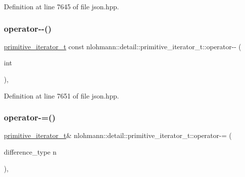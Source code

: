 Definition at line 7645 of file json.\+hpp.

\mbox{\label{classnlohmann_1_1detail_1_1primitive__iterator__t_aef3b5dfeb2cb04dc9d0a024fc1898b98}} 
\subsubsection{\texorpdfstring{operator-\/-\/()}{operator--()}\hspace{0.1cm}{\footnotesize\ttfamily [2/2]}}
{\footnotesize\ttfamily \mbox{\hyperlink{classnlohmann_1_1detail_1_1primitive__iterator__t}{primitive\+\_\+iterator\+\_\+t}} const nlohmann\+::detail\+::primitive\+\_\+iterator\+\_\+t\+::operator-\/-\/ (\begin{DoxyParamCaption}\item[{int}]{ }\end{DoxyParamCaption})\hspace{0.3cm}{\ttfamily [inline]}, {\ttfamily [noexcept]}}



Definition at line 7651 of file json.\+hpp.

\mbox{\label{classnlohmann_1_1detail_1_1primitive__iterator__t_a0bf83ab08abe1ae4b51c790c85cdf151}} 
\subsubsection{\texorpdfstring{operator-\/=()}{operator-=()}}
{\footnotesize\ttfamily \mbox{\hyperlink{classnlohmann_1_1detail_1_1primitive__iterator__t}{primitive\+\_\+iterator\+\_\+t}}\& nlohmann\+::detail\+::primitive\+\_\+iterator\+\_\+t\+::operator-\/= (\begin{DoxyParamCaption}\item[{difference\+\_\+type}]{n }\end{DoxyParamCaption})\hspace{0.3cm}{\ttfamily [inline]}, {\ttfamily [noexcept]}}



